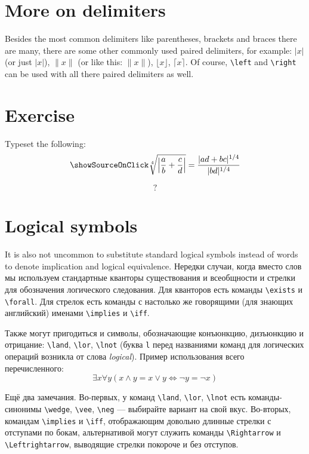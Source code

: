 \section{More on delimiters}
\par Besides the most common delimiters like parentheses, brackets and braces there are many, there are some other commonly used paired delimiters, for example: \( \lvert x \rvert \) (or just \( |x| \)), \( \lVert x \rVert \) (or like this: \( \| x \| \)), \( \lfloor x \rfloor \), \( \lceil x \rceil\). Of course, \verb"\left" and \verb"\right" can be used with all there paired delimiters as well.

\section{Exercise}
\begin{staticpart}
Typeset the following: \[\showSourceOnClick \sqrt[4]{\left\lvert\frac{a}{b}+\frac{c}{d}\right\rvert}=\frac{|ad+bc|^{1/4}}{|bd|^{1/4}}\]
\end{staticpart}
\[?\]

\section{Logical symbols}
\par It is also not uncommon to substitute standard logical symbols instead of words to denote implication and logical equivalence. Нередки случаи, когда вместо слов мы используем стандартные кванторы существования и всеобщности и стрелки для обозначения логического следования. Для кванторов есть команды \verb"\exists" и \verb"\forall". Для стрелок есть команды с настолько же говорящими (для знающих английский) именами \verb"\implies" и \verb"\iff".
\par Также могут пригодиться и символы, обозначающие конъюнкцию, дизъюнкцию и отрицание: \verb"\land", \verb"\lor", \verb"\lnot" (буква \verb"l" перед названиями команд для логических операций возникла от слова \emph{logical}). Пример использования всего перечисленного: \[ \exists x \forall y (x\land y=x\lor y \iff \lnot y=\lnot x) \]
\par Ещё два замечания. Во-первых, у команд \verb"\land", \verb"\lor", \verb"\lnot" есть команды-синонимы \verb"\wedge", \verb"\vee", \verb"\neg" --- выбирайте вариант на свой вкус. Во-вторых, командам \verb"\implies" и \verb"\iff", отображающим довольно длинные стрелки с отступами по бокам, альтернативой могут служить команды \verb"\Rightarrow" и \verb"\Leftrightarrow", выводящие стрелки покороче и без отступов.\index{\Rightarrow,\Leftrightarrow}

